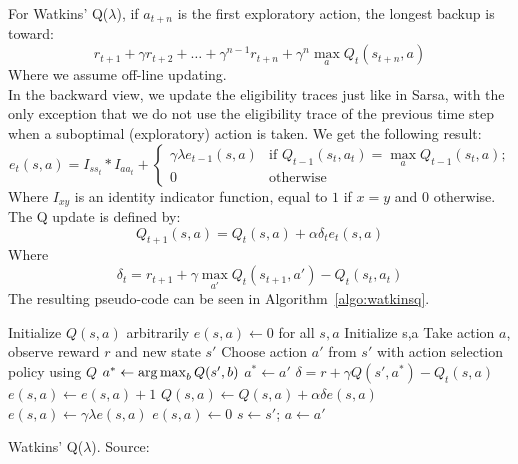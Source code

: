 For Watkins' Q($\lambda$), if $a_{t+n}$ is the first exploratory action, the longest backup is toward:
\begin{equation}
r_{t+1} + \gamma r_{t+2} + \dots + \gamma^{n-1} r_{t+n} + \gamma^n \max_a Q_t(s_{t+n},a)
\end{equation}
Where we assume off-line updating.\\
In the backward view, we update the eligibility traces just like in Sarsa, with the only exception that we do not use the eligibility trace of the previous time step when a suboptimal (exploratory) action is taken. We get the following result:
\begin{equation}
e_t(s,a) = I_{s s_t} * I_{a a_t} + \begin{cases}
    \gamma \lambda e_{t-1}(s,a) & \text{if $Q_{t-1}(s_t,a_t) = \max_a Q_{t-1}(s_t,a)$;} \\
    0 & \text{otherwise}
\end{cases}
\end{equation}
Where $I_{xy}$ is an identity indicator function, equal to $1$ if $x=y$ and $0$ otherwise. The Q update is defined by:
\begin{equation}
Q_{t+1}(s,a) = Q_t(s,a) + \alpha \delta_t e_t(s,a)
\end{equation}
Where
\begin{equation}
\delta_t = r_{t+1} + \gamma \max_{a'} Q_t(s_{t+1}, a') - Q_t(s_t,a_t)
\end{equation}
The resulting pseudo-code can be seen in Algorithm~\ref{algo:watkinsq}.\\
\begin{algorithm}[htb]
\DontPrintSemicolon
Initialize $Q(s,a)$ arbitrarily\;
$e(s,a) \gets 0$ for all $s,a$\;
 {
    Initialize s,a\;
     {
        Take action $a$, observe reward $r$ and new state $s'$\;
        Choose action $a'$ from $s'$ with action selection policy using $Q$\;
        $a^* \gets \operatorname*{arg\,max}_b Q(s',b)$\;
         {
            $a^* \gets a'$\;
        }
        $\delta = r + \gamma Q(s',a^*) - Q_t(s,a)$\;
        $e(s,a) \gets e(s,a) + 1$\;
         {
            $Q(s,a) \gets Q(s,a) + \alpha \delta e(s,a)$\;
             {
                $e(s,a) \gets \gamma \lambda e(s,a)$\;
            }{
                $e(s,a) \gets 0$\;
            }
        }
        $s \gets s'$; $a \gets a'$\;
    }
}
\caption[Watkins' Q($\lambda$)]{Watkins' Q($\lambda$). Source: \cite{Sutton1998ReinforcementIntroduction}}
\label{algo:watkinsq}
\end{algorithm}
